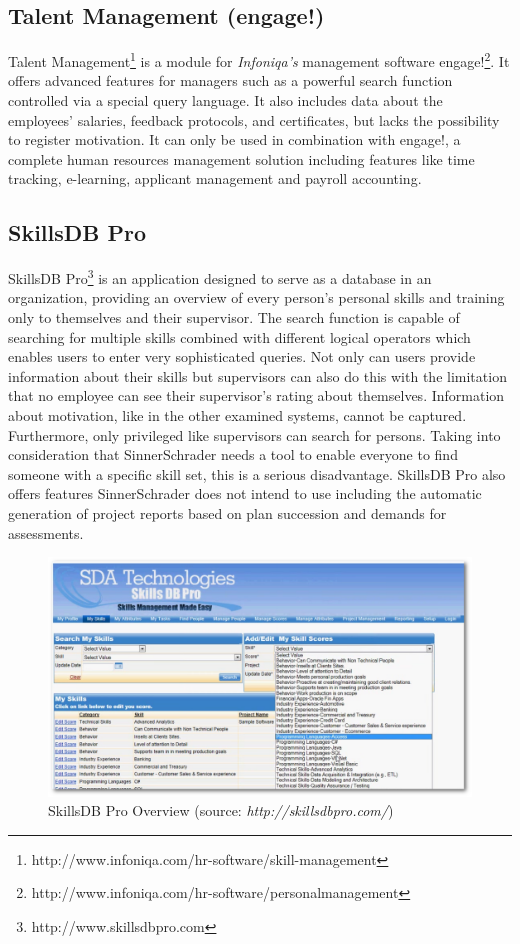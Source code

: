 \subsection{Talent Management (engage!)}
Talent Management\footnote{http://www.infoniqa.com/hr-software/skill-management} is a module for \textit{Infoniqa’s} management software engage!\footnote{http://www.infoniqa.com/hr-software/personalmanagement}. It offers advanced features for managers such as a powerful search function controlled via a special query language. It also includes data about the employees’ salaries, feedback protocols, and certificates, but lacks the possibility to register motivation. It can only be used in combination with engage!, a complete human resources management solution including features like time tracking, e-learning, applicant management and payroll accounting.

\subsection{SkillsDB Pro}
SkillsDB Pro\footnote{http://www.skillsdbpro.com} is an application designed to serve as a database in an organization, providing an overview of every person’s personal skills and training only to themselves and their supervisor. The search function is capable of searching for multiple skills combined with different logical operators which enables users to enter very sophisticated queries.
Not only can users provide information about their skills but supervisors can also do this with the limitation that no employee can see their supervisor's rating about themselves. Information about motivation, like in the other examined systems, cannot be captured.
Furthermore, only privileged like supervisors can search for persons. Taking into consideration that SinnerSchrader needs a tool to enable everyone to find someone with a specific skill set, this is a serious disadvantage.
SkillsDB Pro also offers features SinnerSchrader does not intend to use including the automatic generation of project reports based on plan succession and demands for assessments.

\begin{figure}[!htp]
    \centering
    \includegraphics[width=\textwidth]{images/skillsdbpro.png}
    \caption[Screenshot: SkillsDB Pro Overview]{SkillsDB Pro Overview (source: \textit{http://skillsdbpro.com/})}
    \label{fig:talent_management}
\end{figure}


